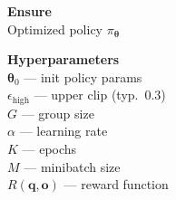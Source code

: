 \documentclass[11pt]{article}
\begin{document}
\begin{algorithm}[p]\small
\caption{CISPO --- Practical Vectorized Implementation}\label{alg:cispo-practical}
\vspace{2pt}
\noindent
\begin{minipage}[t]{0.28\linewidth}
\renewcommand{\arraystretch}{1.12}
\textbf{Ensure} \\[2pt]
Optimized policy $\pi_{\boldsymbol{\theta}}$

\vspace{6pt}
\textbf{Hyperparameters} \\[2pt]
$\boldsymbol{\theta}_0$ --- init policy params \\
$\epsilon_{\text{high}}$ --- upper clip (typ.\ $0.3$) \\
$G$ --- group size \\
$\alpha$ --- learning rate \\
$K$ --- epochs \\
$M$ --- minibatch size \\
$R(\mathbf{q}, \mathbf{o})$ --- reward function


\end{minipage}
\end{algorithm}
\end{document}

